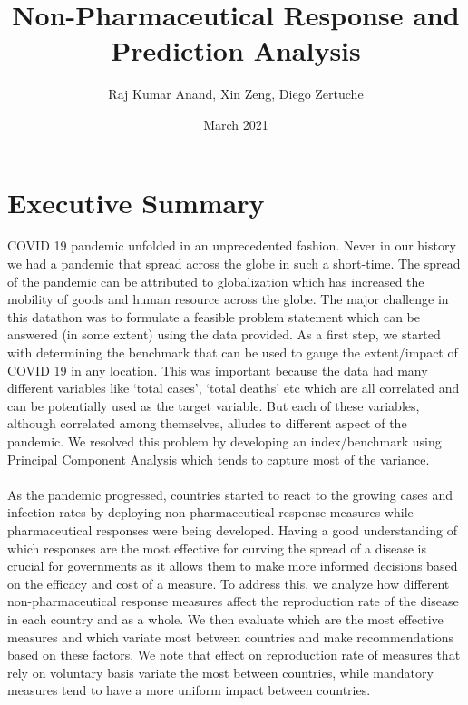 \documentclass{article}
\title{Non-Pharmaceutical Response and Prediction Analysis}
\author{Raj Kumar Anand, Xin Zeng, Diego Zertuche}
\date{March 2021}
\begin{document}
\maketitle

\section{Executive Summary}
COVID 19 pandemic unfolded in an unprecedented fashion. Never in our history we had a pandemic that spread across the globe in such a short-time. The spread of the pandemic can be attributed to globalization which has increased the mobility of goods and human resource across the globe. The major challenge in this datathon was to formulate a feasible problem statement which can be answered (in some extent) using the data provided. As a first step, we started with determining the benchmark that can be used to gauge the extent/impact of COVID 19 in any location. This was important because the data had many different variables like ‘total cases’, ‘total deaths’ etc which are all correlated and can be potentially used as the target variable. But each of these variables, although correlated among themselves, alludes to different aspect of the pandemic. We resolved this problem by developing an index/benchmark using Principal Component Analysis which tends to capture most of the variance. \\
\\
As the pandemic progressed, countries started to react to the growing cases and infection rates by deploying non-pharmaceutical response measures while pharmaceutical responses were being developed. Having a good understanding of which responses are the most effective for curving the spread of a disease is crucial for governments as it allows them to make more informed decisions based on the efficacy and cost of a measure. To address this, we analyze how different non-pharmaceutical response measures affect the reproduction rate of the disease in each country and as a whole. We then evaluate which are the most effective measures and which variate most between countries and make recommendations based on these factors. We note that effect on reproduction rate of measures that rely on voluntary basis variate the most between countries, while mandatory measures tend to have a more uniform impact between countries.\\
\\
\end{document}
